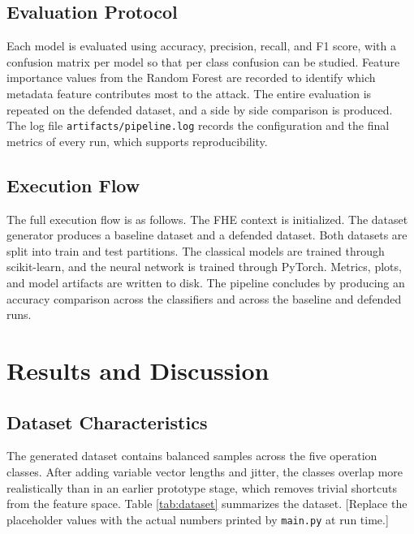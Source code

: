 \documentclass[12pt,a4paper]{article}
\begin{document}
\subsection{Evaluation Protocol}
Each model is evaluated using accuracy, precision, recall, and F1 score, with a confusion matrix per model so that per class confusion can be studied. Feature importance values from the Random Forest are recorded to identify which metadata feature contributes most to the attack. The entire evaluation is repeated on the defended dataset, and a side by side comparison is produced. The log file \texttt{artifacts/pipeline.log} records the configuration and the final metrics of every run, which supports reproducibility.

\subsection{Execution Flow}
The full execution flow is as follows. The FHE context is initialized. The dataset generator produces a baseline dataset and a defended dataset. Both datasets are split into train and test partitions. The classical models are trained through scikit-learn, and the neural network is trained through PyTorch. Metrics, plots, and model artifacts are written to disk. The pipeline concludes by producing an accuracy comparison across the classifiers and across the baseline and defended runs.

\section{Results and Discussion}

\subsection{Dataset Characteristics}
The generated dataset contains balanced samples across the five operation classes. After adding variable vector lengths and jitter, the classes overlap more realistically than in an earlier prototype stage, which removes trivial shortcuts from the feature space. Table \ref{tab:dataset} summarizes the dataset. [Replace the placeholder values with the actual numbers printed by \texttt{main.py} at run time.]
\end{document}

